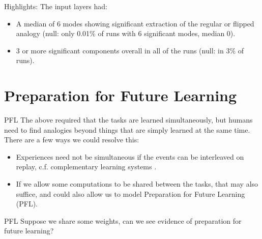 \documentclass{beamer}
\begin{document}
\begin{frame}{Highlights:}
The input layers had:
\begin{itemize}
    \item<1-> A median of 6 modes showing significant extraction of the regular or flipped analogy (null: only 0.01\% of runs with 6 significant modes, median 0).
    \item<2-> 3 or more significant components overall in all of the runs (null: in 3\% of runs).
\end{itemize}
\end{frame}

\section{Preparation for Future Learning}
\begin{frame}{PFL}
The above required that the tasks are learned simultaneously, but humans need to find analogies beyond things that are simply learned at the same time. There are a few ways we could resolve this: 
\begin{itemize}
\item<2-> Experiences need not be simultaneous if the events can be interleaved on replay, c.f. complementary learning systems \cite{Kumaran2016}.
\item<3-> If we allow some computations to be shared between the tasks, that may also suffice, and could also allow us to model Preparation for Future Learning (PFL).
\end{itemize}
\end{frame}

\begin{frame}{PFL}
Suppose we share some weights, can we see evidence of preparation for future learning?\\[11pt]
\begin{columns}
\end{columns}
\end{frame}
\end{document}
